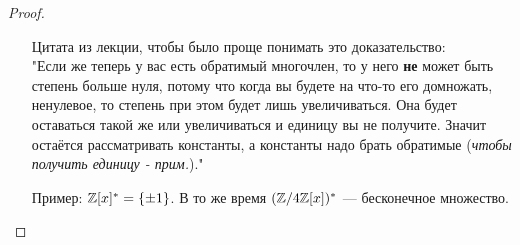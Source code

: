 \begin{normalsize}
\begin{proof}
\begin{itemize}
        Цитата из лекции, чтобы было проще понимать это доказательство: \\
        "Если же теперь у вас есть обратимый многочлен, то у него \textbf{не} может быть степень больше нуля,
        потому что когда вы будете на что-то его домножать, ненулевое, то степень при этом будет лишь
        увеличиваться. Она будет оставаться такой же или увеличиваться и единицу вы не получите.
        Значит остаётся рассматривать константы, а константы надо брать обратимые
        (\emph{чтобы получить единицу - прим.})." 
        \item[Пример:] $\mathbb{Z}[x]^* = \{ \pm 1 \}$. В то же время $(\mathbb{Z} / 4\mathbb{Z} [x])^*$ --- бесконечное множество.
    \end{itemize} 
\end{proof}

\end{normalsize}